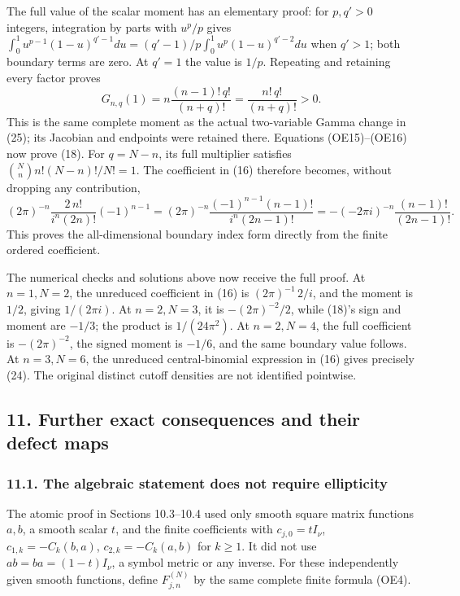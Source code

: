 \documentclass[
  11pt,
]{article}
\begin{document}
The full value of the scalar moment has an elementary proof: for
\(p,q'>0\) integers, integration by parts with \(u^p/p\) gives
\(\int_0^1u^{p-1}(1-u)^{q'-1}du
=(q'-1)/p\int_0^1u^p(1-u)^{q'-2}du\) when \(q'>1\); both boundary terms
are zero. At \(q'=1\) the value is \(1/p\). Repeating and retaining
every factor proves \[
G_{n,q}(1)=n\frac{(n-1)!\,q!}{(n+q)!}
                       =\frac{n!\,q!}{(n+q)!}>0 .
\tag{OE16}
\] This is the same complete moment as the actual two-variable Gamma
change in (25); its Jacobian and endpoints were retained there.
Equations (OE15)--(OE16) now prove (18). For \(q=N-n\), its full
multiplier satisfies \(\binom Nn n!(N-n)!/N!=1\). The coefficient in
(16) therefore becomes, without dropping any contribution, \[
(2\pi)^{-n}\frac{2\,n!}{i^n(2n)!}(-1)^{n-1}
 =(2\pi)^{-n}\frac{(-1)^{n-1}(n-1)!}
                         {i^n(2n-1)!}
 =-(-2\pi i)^{-n}\frac{(n-1)!}{(2n-1)!}.
\tag{OE17}
\] This proves the all-dimensional boundary index form directly from the
finite ordered coefficient.

The numerical checks and solutions above now receive the full proof. At
\(n=1,N=2\), the unreduced coefficient in (16) is \((2\pi)^{-1}\,2/i\),
and the moment is \(1/2\), giving \(1/(2\pi i)\). At \(n=2,N=3\), it is
\(-(2\pi)^{-2}/2\), while (18)'s sign and moment are \(-1/3\); the
product is \(1/(24\pi^2)\). At \(n=2,N=4\), the full coefficient is
\(-(2\pi)^{-2}\), the signed moment is \(-1/6\), and the same boundary
value follows. At \(n=3,N=6\), the unreduced central-binomial expression
in (16) gives precisely (24). The original distinct cutoff densities are
not identified pointwise.

\subsection{11. Further exact consequences and their defect
maps}\label{further-exact-consequences-and-their-defect-maps}

\subsubsection{11.1. The algebraic statement does not require
ellipticity}\label{the-algebraic-statement-does-not-require-ellipticity}

The atomic proof in Sections 10.3--10.4 used only smooth square matrix
functions \(a,b\), a smooth scalar \(t\), and the finite coefficients
with \(c_{j,0}=tI_\nu\), \(c_{1,k}=-C_k(b,a)\), \(c_{2,k}=-C_k(a,b)\)
for \(k\geq1\). It did not use \(ab=ba=(1-t)I_\nu\), a symbol metric or
any inverse. For these independently given smooth functions, define
\(F_{j,n}^{(N)}\) by the same complete finite formula (OE4).
\end{document}
